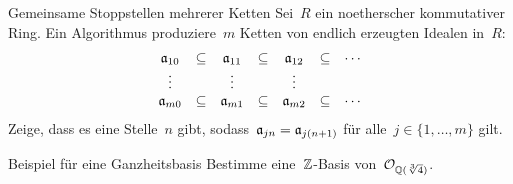 \documentclass{algblatt}
\begin{document}
\begin{aufgabe}{3}{Gemeinsame Stoppstellen mehrerer Ketten}
Sei~$R$ ein noetherscher kommutativer Ring. Ein Algorithmus produziere~$m$
Ketten von endlich erzeugten Idealen in~$R$:
\[ \begin{array}{@{}ccccccc@{}}
  \aa_{10} &\subseteq& \aa_{11} &\subseteq& \aa_{12} &\subseteq& \cdots \\
  \vdots &         & \vdots &         & \vdots &          \\
  \aa_{m0} &\subseteq& \aa_{m1} &\subseteq& \aa_{m2} &\subseteq& \cdots
\end{array} \]
Zeige, dass es eine Stelle~$n$ gibt, sodass~$\aa_{jn} = \aa_{j(n+1)}$ für alle~$j \in
\{ 1,\ldots,m \}$ gilt.
\end{aufgabe}

\begin{aufgabe}{4}{Beispiel für eine Ganzheitsbasis}
Bestimme eine~$\ZZ$-Basis von~$\O_{\QQ(\sqrt[3]{4})}$.
\end{aufgabe}
\end{document}
